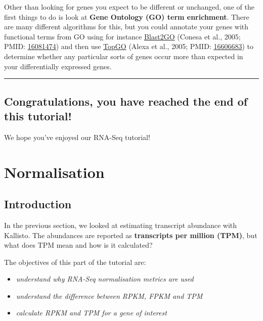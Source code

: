 \documentclass[11pt]{article}
\providecommand{\tightlist}{%
      \setlength{\itemsep}{0pt}\setlength{\parskip}{0pt}}
\begin{document}
Other than looking for genes you expect to be different or unchanged,
one of the first things to do is look at \textbf{Gene Ontology (GO) term
enrichment}. There are many different algorithms for this, but you could
annotate your genes with functional terms from GO using for instance
\url{Blast2GO} (Conesa et al., 2005; PMID:
\href{https://www.ncbi.nlm.nih.gov/pubmed/16081474}{16081474}) and then
use
\href{https://bioconductor.org/packages/release/bioc/html/topGO.html}{TopGO}
(Alexa et al., 2005; PMID:
\href{https://www.ncbi.nlm.nih.gov/pubmed/16606683}{16606683}) to
determine whether any particular sorts of genes occur more than expected
in your differentially expressed genes.

    \begin{center}\rule{0.5\linewidth}{.4pt}\end{center}

    \hypertarget{congratulations-you-have-reached-the-end-of-this-tutorial}{%
\subsection{Congratulations, you have reached the end of this
tutorial!}\label{congratulations-you-have-reached-the-end-of-this-tutorial}}

We hope you've enjoyed our RNA-Seq tutorial!





\newpage





    \hypertarget{normalisation}{%
\section{Normalisation}\label{normalisation}}

\hypertarget{introduction}{%
\subsection{Introduction}\label{introduction}}

In the previous section, we looked at estimating transcript abundance
with Kallisto. The abundances are reported as \textbf{transcripts per
million (TPM)}, but what does TPM mean and how is it calculated?

The objectives of this part of the tutorial are:

\begin{itemize}
\tightlist
\item
  \textit{understand why RNA-Seq normalisation metrics are used}
\item
  \textit{understand the difference between RPKM, FPKM and TPM}
\item
  \textit{calculate RPKM and TPM for a gene of interest}
\end{itemize}
\end{document}
